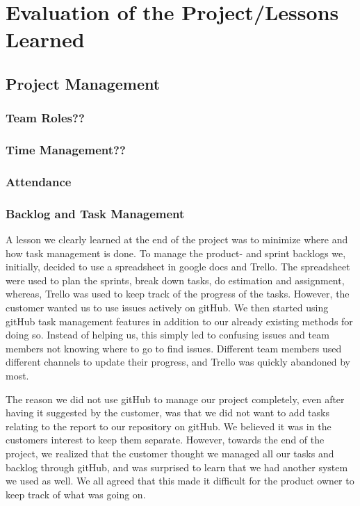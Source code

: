 \chapter{Evaluation of the Project/Lessons Learned}
\section{Project Management}
\subsection{Team Roles??}
\subsection{Time Management??}
\subsection{Attendance}
\subsection{Backlog and Task Management}
A lesson we clearly learned at the end of the project was to minimize where and how task management is done. 
To manage the product- and sprint backlogs we, initially, decided to use a spreadsheet in google docs and Trello. The spreadsheet were used to plan the sprints, break down tasks, do estimation and assignment, whereas, Trello was used to keep track of the progress of the tasks. However, the customer wanted us to use issues actively on gitHub. We then started using gitHub task management features in addition to our already existing methods for doing so. Instead of helping us, this simply led to confusing issues and team members not knowing where to go to find issues. Different team members used different channels to update their progress, and Trello was quickly abandoned by most.

The reason we did not use gitHub to manage our project completely, even after having it suggested by the customer, was that we did not want to add tasks relating to the report to our repository on gitHub. We believed it was in the customers interest to keep them separate. However, towards the end of the project, we realized that the customer thought we managed all our tasks and backlog through gitHub, and was surprised to learn that we had another system we used as well. We all agreed that this made it difficult for the product owner to keep track of what was going on. 

